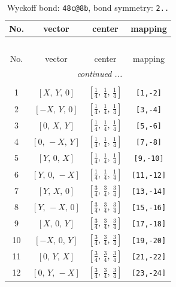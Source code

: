 \documentclass[fleqn,8pt]{jsarticle}
\begin{document}
\begin{longtable}{cccc}
\caption{Wyckoff bond: {\tt 48c@8b}, bond symmetry: {\tt 2..}}
 \\
 \hline \hline
No. & vector & center & mapping \\ \hline \endfirsthead

\multicolumn{3}{l}{\tablename\ \thetable{}} \\
 \hline \hline
No. & vector & center & mapping \\ \hline \endhead

 \hline \hline
\multicolumn{3}{r}{\footnotesize\it continued ...} \\ \endfoot

 \hline \hline
\multicolumn{3}{r}{} \\ \endlastfoot

1 & $\left[ X,\, Y,\, 0 \right]$ & $\left[ \frac{1}{4},\, \frac{1}{4},\, \frac{1}{4} \right]$ & {\tt [1,-2]} \\ \hline
2 & $\left[ - X,\, Y,\, 0 \right]$ & $\left[ \frac{1}{4},\, \frac{1}{4},\, \frac{1}{4} \right]$ & {\tt [3,-4]} \\ \hline
3 & $\left[ 0,\, X,\, Y \right]$ & $\left[ \frac{1}{4},\, \frac{1}{4},\, \frac{1}{4} \right]$ & {\tt [5,-6]} \\ \hline
4 & $\left[ 0,\, - X,\, Y \right]$ & $\left[ \frac{1}{4},\, \frac{1}{4},\, \frac{1}{4} \right]$ & {\tt [7,-8]} \\ \hline
5 & $\left[ Y,\, 0,\, X \right]$ & $\left[ \frac{1}{4},\, \frac{1}{4},\, \frac{1}{4} \right]$ & {\tt [9,-10]} \\ \hline
6 & $\left[ Y,\, 0,\, - X \right]$ & $\left[ \frac{1}{4},\, \frac{1}{4},\, \frac{1}{4} \right]$ & {\tt [11,-12]} \\ \hline
7 & $\left[ Y,\, X,\, 0 \right]$ & $\left[ \frac{3}{4},\, \frac{3}{4},\, \frac{3}{4} \right]$ & {\tt [13,-14]} \\ \hline
8 & $\left[ Y,\, - X,\, 0 \right]$ & $\left[ \frac{3}{4},\, \frac{3}{4},\, \frac{3}{4} \right]$ & {\tt [15,-16]} \\ \hline
9 & $\left[ X,\, 0,\, Y \right]$ & $\left[ \frac{3}{4},\, \frac{3}{4},\, \frac{3}{4} \right]$ & {\tt [17,-18]} \\ \hline
10 & $\left[ - X,\, 0,\, Y \right]$ & $\left[ \frac{3}{4},\, \frac{3}{4},\, \frac{3}{4} \right]$ & {\tt [19,-20]} \\ \hline
11 & $\left[ 0,\, Y,\, X \right]$ & $\left[ \frac{3}{4},\, \frac{3}{4},\, \frac{3}{4} \right]$ & {\tt [21,-22]} \\ \hline
12 & $\left[ 0,\, Y,\, - X \right]$ & $\left[ \frac{3}{4},\, \frac{3}{4},\, \frac{3}{4} \right]$ & {\tt [23,-24]} \\
\end{longtable}
\end{document}
